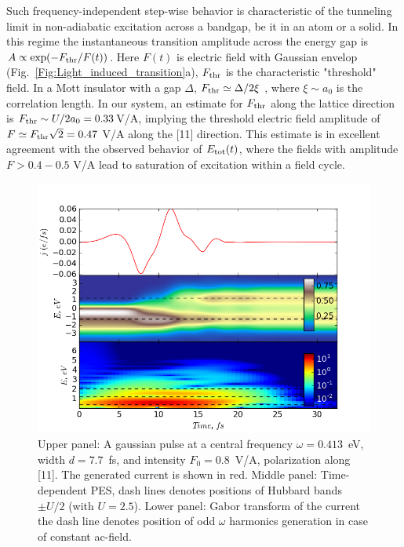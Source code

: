 Such frequency-independent step-wise behavior is characteristic of the tunneling limit in non-adiabatic excitation across a bandgap, be
it in an atom or a solid. In this regime the 
instantaneous transition amplitude across the 
energy gap is $A\propto \exp(-F_{\rm thr}/F(t))$. Here 
$F(t)$ is electric field with Gaussian envelop (Fig.~\ref{Fig:Light_induced_transition}a),
$F_{\rm thr}$ is the characteristic "threshold" field.
In a Mott insulator with a gap $\Delta$, 
$F_{\rm thr}\simeq \Delta /2\xi$ \cite{Oka_2003,Oka_2005,Oka_2010,Oka_2012}, where
$\xi\sim a_0$ is the correlation length. In our system,
an estimate for $F_{\rm thr}$ 
along the lattice direction is $F_{\rm thr}\sim U/2a_0=0.33 $V/A,
implying the threshold electric field amplitude of $F\simeq F_{\rm thr}\sqrt{2}=0.47$ V/A along the [11] direction. This estimate
is in excellent agreement with the observed behavior of 
$E_{\rm tot}(t)$, where the  
fields with amplitude $F>0.4-0.5$ V/A lead to 
saturation of excitation within a field cycle.
\begin{figure}[h!]
 \includegraphics[width=0.9\linewidth,angle=0]{Chapters/KH_solid/2_w_0_961.png}
\caption{Upper panel: A gaussian pulse at a central frequency $\omega=0.413$~eV, width $d=7.7$~fs, and intensity $F_{0}=0.8$~V/A, polarization along [11]. The generated current is shown in red. Middle panel: Time-dependent PES, dash lines denotes positions of Hubbard bands $\pm U/2$ (with $U=2.5$). Lower panel: Gabor transform of the current the dash line denotes position of odd $\omega$ harmonics generation in case of constant ac-field.}
\label{HHG_1}  
\end{figure}


